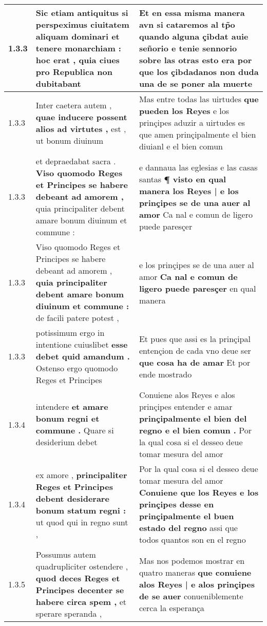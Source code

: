 \begin{tabular}{|p{1cm}|p{6.5cm}|p{6.5cm}|}
1.3.3 & Sic etiam antiquitus \textbf{ si perspeximus ciuitatem aliquam dominari et tenere monarchiam : } hoc erat , quia ciues pro Republica non dubitabant & Et en essa misma manera avn si cataremos al tp̃o \textbf{ quando alguna çibdat auie señorio e tenie sennorio sobre las otras esto era } por que los çibdadanos non duda una de se poner ala muerte \\\hline
1.3.3 & Inter caetera autem , \textbf{ quae inducere possent alios ad virtutes , } est , ut bonum diuinum & Mas entre todas las uirtudes \textbf{ que pueden los Reyes } e los prinçipes aduzir a uirtudes es que amen prinçipalmente el bien diuianl e el bien comun \\\hline
1.3.3 & et depraedabat sacra . \textbf{ Viso quomodo Reges et Principes se habere debeant ad amorem , } quia principaliter debent amare bonum diuinum et commune : & e dannaua las eglesias e las casas santas \textbf{ ¶ visto en qual manera los Reyes | e los prinçipes se de una auer al amor } Ca nal e comun de ligero puede paresçer \\\hline
1.3.3 & Viso quomodo Reges et Principes se habere debeant ad amorem , \textbf{ quia principaliter debent amare bonum diuinum et commune : } de facili patere potest , & e los prinçipes se de una auer al amor \textbf{ Ca nal e comun de ligero puede paresçer } en qual manera \\\hline
1.3.3 & potissimum ergo in intentione cuiuslibet \textbf{ esse debet quid amandum . } Ostenso ergo quomodo Reges et Principes & Et pues que assi es la prinçipal entençion de cada vno deue ser \textbf{ que cosa ha de amar } Et por ende mostrado \\\hline
1.3.4 & intendere \textbf{ et amare bonum regni et commune . } Quare si desiderium debet & Conuiene alos Reyes e alos prinçipes entender e amar \textbf{ prinçipalmente el bien del regno e el bien comun . } Por la qual cosa si el desseo deue tomar mesura del amor \\\hline
1.3.4 & ex amore , \textbf{ principaliter Reges et Principes debent desiderare bonum statum regni : } ut quod qui in regno sunt , & Por la qual cosa si el desseo deue tomar mesura del amor \textbf{ Conuiene que los Reyes e los prinçipes desse en prinçipalmente el buen estado del regno } assi que todos quantos son en el regno \\\hline
1.3.5 & Possumus autem quadrupliciter ostendere , \textbf{ quod deces Reges et Principes decenter se habere circa spem , } et sperare speranda , & Mas nos podemos mostrar en quatro maneras \textbf{ que conuiene alos Reyes | e alos prinçipes de se auer } conueniblemente cerca la esperança \\\hline

\end{tabular}
